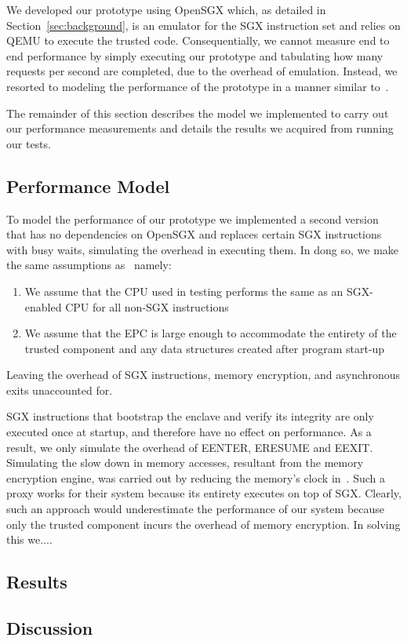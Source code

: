 \documentclass[../main.tex]{subfiles}
\begin{document}
We developed our prototype using OpenSGX which, as detailed in
Section~\ref{sec:background}, is an emulator for the SGX instruction
set and relies on QEMU to execute the trusted code. Consequentially,
we cannot measure end to end performance by simply executing our
prototype and tabulating how many requests per second are completed,
due to the overhead of emulation.  Instead, we resorted to modeling
the performance of the prototype in a manner similar
to~\cite{Baumann14}.

The remainder of this section describes the model we implemented to
carry out our performance measurements and details the results we
acquired from running our tests.

\subsection{Performance Model}

To model the performance of our prototype we implemented a second
version that has no dependencies on OpenSGX and replaces certain SGX
instructions with busy waits, simulating the overhead in executing
them. In dong so, we make the same assumptions as~\cite{Baumann14}
namely:
\begin{enumerate}
  \item We assume that the CPU used in testing performs the same as an
    SGX-enabled CPU for all non-SGX instructions
  \item We assume that the EPC is large enough to accommodate the
    entirety of the trusted component and any data structures created
    after program start-up
\end{enumerate}
Leaving the overhead of SGX instructions, memory encryption, and
asynchronous exits unaccounted for.

SGX instructions that bootstrap the enclave and verify its integrity
are only executed once at startup, and therefore have no effect on
performance. As a result, we only simulate the overhead of EENTER,
ERESUME and EEXIT. Simulating the slow down in memory accesses,
resultant from the memory encryption engine, was carried out by
reducing the memory's clock in~\cite{Baumann14}. Such a proxy works
for their system because its entirety executes on top of SGX. Clearly,
such an approach would underestimate the performance of our system
because only the trusted component incurs the overhead of memory
encryption.  In solving this
we....%

\subsection{Results}
\subsection{Discussion}
\end{document}
